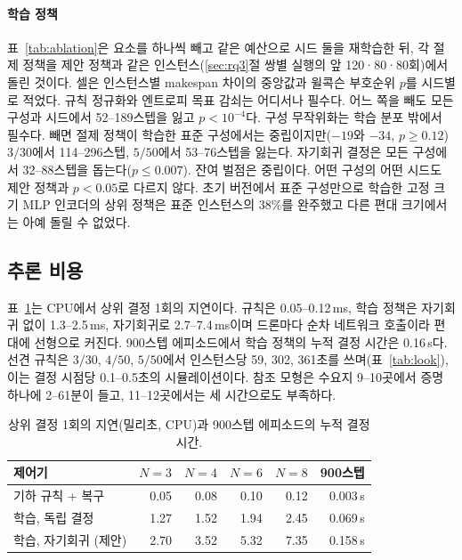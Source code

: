 \documentclass[final,5p,times,twocolumn]{elsarticle}
\begin{document}
\paragraph{학습 정책}
표~\ref{tab:ablation}은 요소를 하나씩 빼고 같은 예산으로 시드 둘을 재학습한 뒤, 각 절제 정책을
제안 정책과 같은 인스턴스(\ref{sec:rq3}절 쌍별 실행의 앞 120·80·80회)에서 돌린 것이다. 셀은
인스턴스별 makespan 차이의 중앙값과 윌콕슨 부호순위 $p$를 시드별로 적었다. 규칙 정규화와
엔트로피 목표 감쇠는 어디서나 필수다. 어느 쪽을 빼도 모든 구성과 시드에서 52--189스텝을 잃고
$p<10^{-4}$다. 구성 무작위화는 학습 분포 밖에서 필수다. 빼면 절제 정책이 학습한 표준 구성에서는
중립이지만($-19$와 $-34$, $p \ge 0.12$) $3/30$에서 114--296스텝, $5/50$에서 53--76스텝을 잃는다.
자기회귀 결정은 모든 구성에서 32--88스텝을 돕는다($p \le 0.007$). 잔여 벌점은 중립이다. 어떤
구성의 어떤 시드도 제안 정책과 $p<0.05$로 다르지 않다. 초기 버전에서 표준 구성만으로 학습한 고정
크기 MLP 인코더의 상위 정책은 표준 인스턴스의 38\%를 완주했고 다른 편대 크기에서는 아예 돌릴 수
없었다.

\begin{table}[t]
\centering
\caption{학습 정책의 절제. 각 셀은 독립 학습한 시드 둘에 대해, 절제 정책과 제안 정책을 같은
인스턴스에서 비교한 인스턴스별 makespan 차이의 중앙값(양수: 뺀 요소가 필요했음)과 윌콕슨 부호순위
$p$다.}
\label{tab:ablation}
\footnotesize

\end{table}

\subsection{추론 비용}
\label{sec:cost}

표~\ref{tab:latency}는 CPU에서 상위 결정 1회의 지연이다. 규칙은 0.05--0.12\,ms, 학습 정책은
자기회귀 없이 1.3--2.5\,ms, 자기회귀로 2.7--7.4\,ms이며 드론마다 순차 네트워크 호출이라 편대에
선형으로 커진다. 900스텝 에피소드에서 학습 정책의 누적 결정 시간은 0.16\,s다. 선견 규칙은 $3/30$, $4/50$, $5/50$에서
인스턴스당 59, 302, 361초를 쓰며(표~\ref{tab:look}), 이는 결정 시점당 0.1--0.5초의 시뮬레이션이다.
참조 모형은 수요지 9--10곳에서 증명 하나에 2--61분이 들고, 11--12곳에서는 세 시간으로도 부족하다.

\begin{table}[t]
\centering
\caption{상위 결정 1회의 지연(밀리초, CPU)과 900스텝 에피소드의 누적 결정 시간.}
\label{tab:latency}
\small
\begin{tabular}{lrrrrr}
\toprule
제어기 & $N=3$ & $N=4$ & $N=6$ & $N=8$ & 900스텝 \\
\midrule
기하 규칙 + 복구 & 0.05 & 0.08 & 0.10 & 0.12 & 0.003\,s \\
학습, 독립 결정 & 1.27 & 1.52 & 1.94 & 2.45 & 0.069\,s \\
학습, 자기회귀 (제안) & 2.70 & 3.52 & 5.32 & 7.35 & 0.158\,s \\
\bottomrule
\end{tabular}
\end{table}
\end{document}
